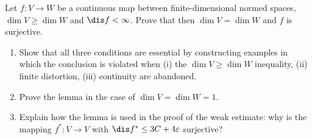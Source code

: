 \documentclass[a4paper,12pt]{report}
\begin{document}
\begin{task}
Let $f\colon V \to W$ be a continuous map between finite-dimensional normed spaces, $\dim V \ge \dim W$ and $\dis f < \infty$. Prove that then $\dim V = \dim W$ and $f$ is surjective.

\begin{enumerate}[label=\textup{(\alph*)}]
\item Show that all three conditions are essential by constructing examples in which the conclusion is violated when \textup{(i)} the $\dim V \ge \dim W$ inequality, \textup{(ii)} finite distortion, \textup{(iii)} continuity are abandoned.
\item\label{it:webster_dim1} Prove the lemma in the case of $\dim V = \dim W = 1$.
\item Explain how the lemma is used in the proof of the weak estimate\textup{:} why is the mapping $f^*\colon V \to V$ with $\dis f^* \le 3C + 4\varepsilon$ surjective?
\end{enumerate}

\end{task}
\end{document}
